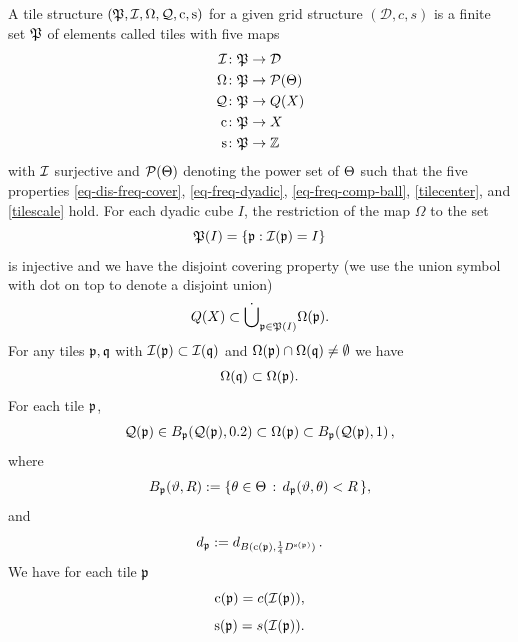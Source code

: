 A tile structure $({\mathfrak P},{\mathcal{I}},{\Omega},{\mathcal{Q}},{\mathrm{c}},{\mathrm{s}})$
for a given grid structure $(\mathcal{D}, c, s)$
is a finite set ${\mathfrak P}$ of elements called tiles with five maps
\begin{align*}
    {\mathcal{I}}&\colon {\mathfrak P}\to {\mathcal{D}}\\
    {\Omega}&\colon {\mathfrak P}\to \mathcal{P}({\Theta}) \\
    {\mathcal{Q}} &\colon {\mathfrak P}\to {Q}(X)\\
    {\mathrm{c}} &\colon {\mathfrak P}\to X\\
    {\mathrm{s}} &\colon {\mathfrak P}\to \mathbb{Z}
\end{align*}
with ${\mathcal{I}}$ surjective and $\mathcal{P}({\Theta})$ denoting the power set of ${\Theta}$ such that the five properties \eqref{eq-dis-freq-cover}, \eqref{eq-freq-dyadic},
\eqref{eq-freq-comp-ball}, \eqref{tilecenter}, and
\eqref{tilescale} hold.
For each dyadic cube $I$, the restriction of the map $\Omega$ to the set
\begin{equation}\label{injective}
    {\mathfrak P}(I)=\{{\mathfrak p}: {\mathcal{I}}({\mathfrak p}) =I\}
\end{equation}
is injective
and we have the disjoint covering property (we use the union symbol with dot on top to denote a disjoint union)
\begin{equation}\label{eq-dis-freq-cover}
    {Q}(X)\subset \dot{\bigcup}_{{\mathfrak p}\in {\mathfrak P}(I)}{\Omega}({\mathfrak p}).
\end{equation}
For any tiles ${\mathfrak p},{\mathfrak q}$ with ${\mathcal{I}}({\mathfrak p})\subset {\mathcal{I}}({\mathfrak q})$ and ${\Omega}({\mathfrak p}) \cap {\Omega}({\mathfrak q}) \neq \emptyset$ we have
\begin{equation} \label{eq-freq-dyadic}
    {\Omega}({\mathfrak q})\subset {\Omega}({\mathfrak p}) .
\end{equation}
For each tile ${\mathfrak p}$,
\begin{equation}\label{eq-freq-comp-ball}
    {\mathcal{Q}}({\mathfrak p})\in B_{{\mathfrak p}}({\mathcal{Q}}({\mathfrak p}), 0.2) \subset {\Omega}({\mathfrak p}) \subset B_{{\mathfrak p}}({\mathcal{Q}}({\mathfrak p}),1)\,,
\end{equation}
where
\begin{equation}
    B_{{\mathfrak p}} ({\vartheta}, R) := \{{\theta} \in {\Theta} \, : \, d_{{\mathfrak p}}({\vartheta}, {\theta}) < R\,\} ,
\end{equation}
and
\begin{equation}\label{defdp}
    d_{{\mathfrak p}} := d_{B({\mathrm{c}}({\mathfrak p}),\frac 14 D^{{\mathrm{s}}({\mathfrak p})})}\, .
\end{equation}
We have for each tile ${\mathfrak p}$
\begin{equation}\label{tilecenter}
    {\mathrm{c}}({\mathfrak p})=c({\mathcal{I}}({\mathfrak p})),
\end{equation}
\begin{equation}\label{tilescale}
    {\mathrm{s}}({\mathfrak p})=s({\mathcal{I}}({\mathfrak p})).
\end{equation}


